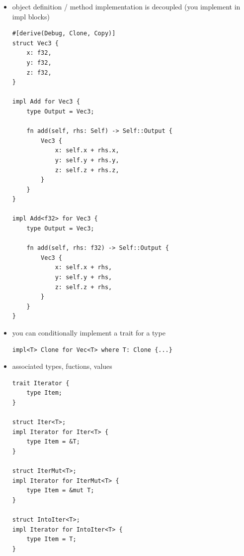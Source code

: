 \documentclass[
  9pt,
  ignorenonframetext,
]{beamer}
\begin{document}
\begin{frame}[fragile]
\begin{itemize}
\item
  object definition / method implementation is decoupled (you implement
  in impl blocks)

\begin{lstlisting}
#[derive(Debug, Clone, Copy)]
struct Vec3 {
    x: f32,
    y: f32,
    z: f32,
}

impl Add for Vec3 {
    type Output = Vec3;

    fn add(self, rhs: Self) -> Self::Output {
        Vec3 {
            x: self.x + rhs.x,
            y: self.y + rhs.y,
            z: self.z + rhs.z,
        }
    }
}

impl Add<f32> for Vec3 {
    type Output = Vec3;

    fn add(self, rhs: f32) -> Self::Output {
        Vec3 {
            x: self.x + rhs,
            y: self.y + rhs,
            z: self.z + rhs,
        }
    }
}
\end{lstlisting}
\end{itemize}
\end{frame}

\begin{frame}[fragile]
\begin{itemize}
\item
  you can conditionally implement a trait for a type

\begin{lstlisting}
impl<T> Clone for Vec<T> where T: Clone {...}
\end{lstlisting}
\end{itemize}
\end{frame}

\begin{frame}[fragile]
\begin{itemize}
\item
  associated types, fuctions, values

\begin{lstlisting}
trait Iterator {
    type Item;
}

struct Iter<T>;
impl Iterator for Iter<T> {
    type Item = &T;
}

struct IterMut<T>;
impl Iterator for IterMut<T> {
    type Item = &mut T;
}

struct IntoIter<T>;
impl Iterator for IntoIter<T> {
    type Item = T;
}
\end{lstlisting}
\end{itemize}
\end{frame}
\end{document}
